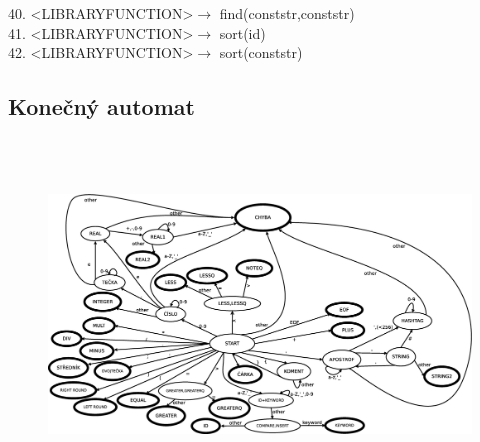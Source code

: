 \documentclass[12pt,a4paper,titlepage,final]{report}
\begin{document}
40. \textless LIBRARYFUNCTION\textgreater  $\rightarrow$ find(conststr,conststr) \\
41. \textless LIBRARYFUNCTION\textgreater  $\rightarrow$ sort(id) \\
42. \textless LIBRARYFUNCTION\textgreater  $\rightarrow$ sort(conststr) \\
\newpage
\begin{landscape}
\section{Konečný automat}
\begin{figure}[!h]
\centering
\includegraphics[height=350px]{img/IFJ_KA}
\end{figure}
\end{landscape}
\clearpage%
\newpage
\end{document}
